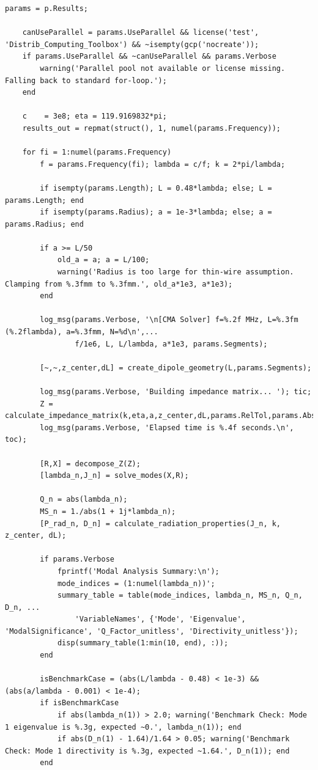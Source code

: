 \documentclass[11pt, a4paper]{report}
\begin{document}
\begin{lstlisting}[caption={The core MoM/CMA solver for a thin-wire dipole.}, label={lst:main_cma}]
    params = p.Results;
    
    canUseParallel = params.UseParallel && license('test', 'Distrib_Computing_Toolbox') && ~isempty(gcp('nocreate'));
    if params.UseParallel && ~canUseParallel && params.Verbose
        warning('Parallel pool not available or license missing. Falling back to standard for-loop.');
    end

    c    = 3e8; eta = 119.9169832*pi;
    results_out = repmat(struct(), 1, numel(params.Frequency));

    for fi = 1:numel(params.Frequency)
        f = params.Frequency(fi); lambda = c/f; k = 2*pi/lambda;
        
        if isempty(params.Length); L = 0.48*lambda; else; L = params.Length; end
        if isempty(params.Radius); a = 1e-3*lambda; else; a = params.Radius; end

        if a >= L/50
            old_a = a; a = L/100;
            warning('Radius is too large for thin-wire assumption. Clamping from %.3fmm to %.3fmm.', old_a*1e3, a*1e3);
        end

        log_msg(params.Verbose, '\n[CMA Solver] f=%.2f MHz, L=%.3fm (%.2flambda), a=%.3fmm, N=%d\n',...
                f/1e6, L, L/lambda, a*1e3, params.Segments);

        [~,~,z_center,dL] = create_dipole_geometry(L,params.Segments);
        
        log_msg(params.Verbose, 'Building impedance matrix... '); tic;
        Z = calculate_impedance_matrix(k,eta,a,z_center,dL,params.RelTol,params.AbsTol,canUseParallel);
        log_msg(params.Verbose, 'Elapsed time is %.4f seconds.\n', toc);

        [R,X] = decompose_Z(Z);
        [lambda_n,J_n] = solve_modes(X,R);

        Q_n = abs(lambda_n);
        MS_n = 1./abs(1 + 1j*lambda_n);
        [P_rad_n, D_n] = calculate_radiation_properties(J_n, k, z_center, dL);

        if params.Verbose
            fprintf('Modal Analysis Summary:\n');
            mode_indices = (1:numel(lambda_n))';
            summary_table = table(mode_indices, lambda_n, MS_n, Q_n, D_n, ...
                'VariableNames', {'Mode', 'Eigenvalue', 'ModalSignificance', 'Q_Factor_unitless', 'Directivity_unitless'});
            disp(summary_table(1:min(10, end), :));
        end

        isBenchmarkCase = (abs(L/lambda - 0.48) < 1e-3) && (abs(a/lambda - 0.001) < 1e-4);
        if isBenchmarkCase
            if abs(lambda_n(1)) > 2.0; warning('Benchmark Check: Mode 1 eigenvalue is %.3g, expected ~0.', lambda_n(1)); end
            if abs(D_n(1) - 1.64)/1.64 > 0.05; warning('Benchmark Check: Mode 1 directivity is %.3g, expected ~1.64.', D_n(1)); end
        end


\end{lstlisting}
\end{document}
